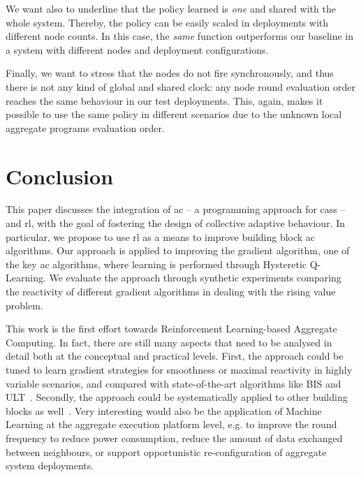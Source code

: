 We want also to underline that the policy learned is \emph{one} and shared with the whole system.  
%
Thereby, the policy can be easily scaled in deployments with different node counts. 
%
In this case, the \emph{same} function outperforms our baseline in a system with different nodes and deployment configurations. 
%

Finally, we want to stress that the nodes do not fire synchronously, and thus there is not any kind of global and shared clock: any node round evaluation order reaches the same behaviour in our test deployments. 
%
This, again, makes it possible to use the same policy in different scenarios due to the unknown local aggregate programs evaluation order.

\section{Conclusion}\label{s:conc}

This paper discusses the integration of \acl{ac} -- a programming approach for \aclp{cas} -- and \acl{rl}, with the goal of fostering the design of collective adaptive behaviour.
% 
In particular, we propose to use \ac{rl} as a means to improve building block \ac{ac} algorithms. %
%
Our approach is applied to improving the gradient algorithm, one of the key \ac{ac} algorithms, where learning is performed through Hysteretic Q-Learning.
%
We evaluate the approach through synthetic experiments comparing the reactivity of different gradient algorithms in dealing with the rising value problem.

This work is the first effort towards Reinforcement Learning-based Aggregate Computing.
%
In fact, there are still many aspects that need to be analysed in detail both at the conceptual and practical levels.
%
First, the approach could be tuned to learn gradient strategies for smoothness or maximal reactivity in highly variable scenarios, and compared with state-of-the-art algorithms like BIS and ULT~\cite{DBLP:conf/saso/AudritoCDV17}. 
%
Secondly, the approach could be systematically applied to other building blocks as well~\cite{DBLP:journals/jlap/ViroliBDACP19}.
%
Very interesting would also be the application of Machine Learning at the aggregate execution platform level, e.g. to improve the round frequency to reduce power consumption, reduce the amount of data exchanged between neighbours, or support opportunistic re-configuration of aggregate system deployments.
%

\printbibliography